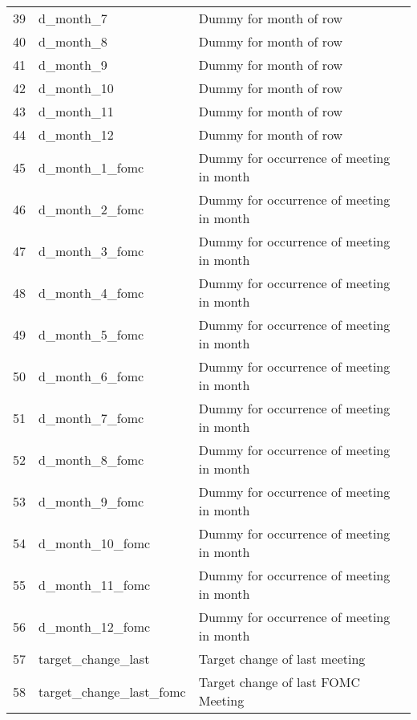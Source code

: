 \begin{tabular}{lll}
39  &                  d\_month\_7 &                             Dummy for month of row \\
40  &                  d\_month\_8 &                             Dummy for month of row \\
41  &                  d\_month\_9 &                             Dummy for month of row \\
42  &                 d\_month\_10 &                             Dummy for month of row \\
43  &                 d\_month\_11 &                             Dummy for month of row \\
44  &                 d\_month\_12 &                             Dummy for month of row \\
45  &             d\_month\_1\_fomc &           Dummy for occurrence of meeting in month \\
46  &             d\_month\_2\_fomc &           Dummy for occurrence of meeting in month \\
47  &             d\_month\_3\_fomc &           Dummy for occurrence of meeting in month \\
48  &             d\_month\_4\_fomc &           Dummy for occurrence of meeting in month \\
49  &             d\_month\_5\_fomc &           Dummy for occurrence of meeting in month \\
50  &             d\_month\_6\_fomc &           Dummy for occurrence of meeting in month \\
51  &             d\_month\_7\_fomc &           Dummy for occurrence of meeting in month \\
52  &             d\_month\_8\_fomc &           Dummy for occurrence of meeting in month \\
53  &             d\_month\_9\_fomc &           Dummy for occurrence of meeting in month \\
54  &            d\_month\_10\_fomc &           Dummy for occurrence of meeting in month \\
55  &            d\_month\_11\_fomc &           Dummy for occurrence of meeting in month \\
56  &            d\_month\_12\_fomc &           Dummy for occurrence of meeting in month \\
57  &         target\_change\_last &                      Target change of last meeting \\
58  &    target\_change\_last\_fomc &                 Target change of last FOMC Meeting \\

\end{tabular}
